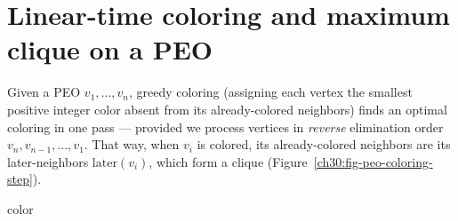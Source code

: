 \section{Linear-time coloring and maximum clique on a PEO}

Given a PEO $v_1,\dots,v_n$, greedy coloring (assigning each vertex the smallest positive integer color absent from its already-colored neighbors) finds an optimal coloring in one pass --- provided we process vertices in \emph{reverse} elimination order $v_n,v_{n-1},\dots,v_1$. That way, when $v_i$ is colored, its already-colored neighbors are its later-neighbors $\mathrm{later}(v_i)$, which form a clique (Figure~\ref{ch30:fig-peo-coloring-step}).

\begin{algorithm}[H]
\caption{Optimal greedy coloring of a chordal graph from a PEO}
\label{ch30:alg-color}
\Return $\mathrm{color}$\;
\end{algorithm}

